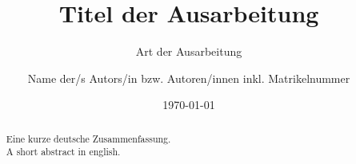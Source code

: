 \documentclass[BCOR=1cm, twoside, ngerman]{scrreprt}
\title{Titel der Ausarbeitung}
\subtitle{Art der Ausarbeitung}
\author{Name der/s Autors/in bzw. Autoren/innen inkl. Matrikelnummer}
\date{\today} %
\begin{document}
\maketitle

\begin{abstract}
Eine kurze deutsche Zusammenfassung.\\

A short abstract in english.
\end{abstract}

\tableofcontents
\printbibliography[heading=bibintoc, title={Literaturverzeichnis}]




% 
% 
% 
% 
\end{document}
